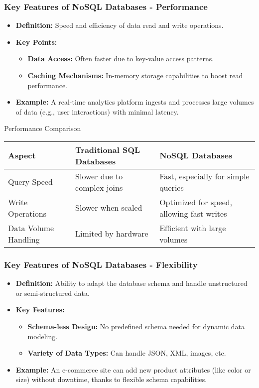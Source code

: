 \documentclass[aspectratio=169]{beamer}
\begin{document}
\begin{frame}[fragile]
    \frametitle{Key Features of NoSQL Databases - Performance}
    \begin{itemize}
        \item \textbf{Definition:} Speed and efficiency of data read and write operations.
        \item \textbf{Key Points:}
        \begin{itemize}
            \item \textbf{Data Access:} Often faster due to key-value access patterns.
            \item \textbf{Caching Mechanisms:} In-memory storage capabilities to boost read performance.
        \end{itemize}
        \item \textbf{Example:} A real-time analytics platform ingests and processes large volumes of data (e.g., user interactions) with minimal latency.
    \end{itemize}
    
    \begin{block}{Performance Comparison}
        \begin{tabular}{|l|l|l|}
            \hline
            \textbf{Aspect} & \textbf{Traditional SQL Databases} & \textbf{NoSQL Databases} \\
            \hline
            Query Speed & Slower due to complex joins & Fast, especially for simple queries \\
            \hline
            Write Operations & Slower when scaled & Optimized for speed, allowing fast writes \\
            \hline
            Data Volume Handling & Limited by hardware & Efficient with large volumes \\
            \hline
        \end{tabular}
    \end{block}
\end{frame}

\begin{frame}[fragile]
    \frametitle{Key Features of NoSQL Databases - Flexibility}
    \begin{itemize}
        \item \textbf{Definition:} Ability to adapt the database schema and handle unstructured or semi-structured data.
        \item \textbf{Key Features:}
        \begin{itemize}
            \item \textbf{Schema-less Design:} No predefined schema needed for dynamic data modeling.
            \item \textbf{Variety of Data Types:} Can handle JSON, XML, images, etc.
        \end{itemize}
        \item \textbf{Example:} An e-commerce site can add new product attributes (like color or size) without downtime, thanks to flexible schema capabilities.
    \end{itemize}
\end{frame}
\end{document}
